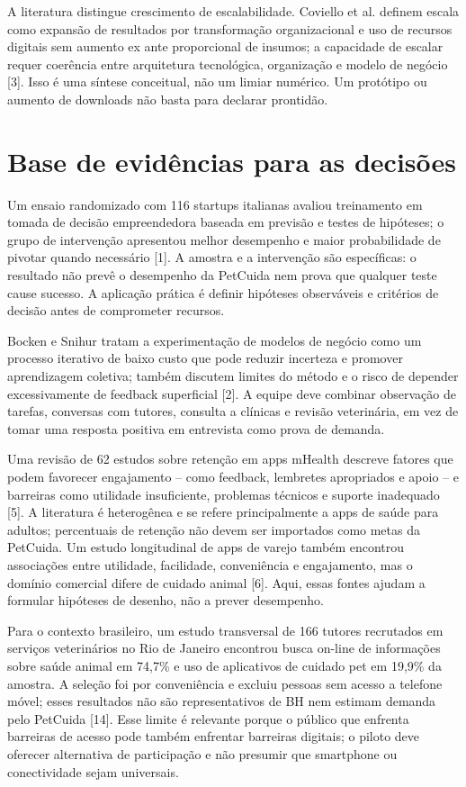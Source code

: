 \documentclass[12pt,a4paper]{article}
\begin{document}
A literatura distingue crescimento de escalabilidade. Coviello et al. definem escala como expansão de resultados por transformação organizacional e uso de recursos digitais sem aumento ex ante proporcional de insumos; a capacidade de escalar requer coerência entre arquitetura tecnológica, organização e modelo de negócio [3]. Isso é uma síntese conceitual, não um limiar numérico. Um protótipo ou aumento de downloads não basta para declarar prontidão.

\section{Base de evidências para as decisões}
Um ensaio randomizado com 116 startups italianas avaliou treinamento em tomada de decisão empreendedora baseada em previsão e testes de hipóteses; o grupo de intervenção apresentou melhor desempenho e maior probabilidade de pivotar quando necessário [1]. A amostra e a intervenção são específicas: o resultado não prevê o desempenho da PetCuida nem prova que qualquer teste cause sucesso. A aplicação prática é definir hipóteses observáveis e critérios de decisão antes de comprometer recursos.

Bocken e Snihur tratam a experimentação de modelos de negócio como um processo iterativo de baixo custo que pode reduzir incerteza e promover aprendizagem coletiva; também discutem limites do método e o risco de depender excessivamente de feedback superficial [2]. A equipe deve combinar observação de tarefas, conversas com tutores, consulta a clínicas e revisão veterinária, em vez de tomar uma resposta positiva em entrevista como prova de demanda.

Uma revisão de 62 estudos sobre retenção em apps mHealth descreve fatores que podem favorecer engajamento -- como feedback, lembretes apropriados e apoio -- e barreiras como utilidade insuficiente, problemas técnicos e suporte inadequado [5]. A literatura é heterogênea e se refere principalmente a apps de saúde para adultos; percentuais de retenção não devem ser importados como metas da PetCuida. Um estudo longitudinal de apps de varejo também encontrou associações entre utilidade, facilidade, conveniência e engajamento, mas o domínio comercial difere de cuidado animal [6]. Aqui, essas fontes ajudam a formular hipóteses de desenho, não a prever desempenho.

Para o contexto brasileiro, um estudo transversal de 166 tutores recrutados em serviços veterinários no Rio de Janeiro encontrou busca on-line de informações sobre saúde animal em 74,7\% e uso de aplicativos de cuidado pet em 19,9\% da amostra. A seleção foi por conveniência e excluiu pessoas sem acesso a telefone móvel; esses resultados não são representativos de BH nem estimam demanda pelo PetCuida [14]. Esse limite é relevante porque o público que enfrenta barreiras de acesso pode também enfrentar barreiras digitais; o piloto deve oferecer alternativa de participação e não presumir que smartphone ou conectividade sejam universais.
\end{document}
